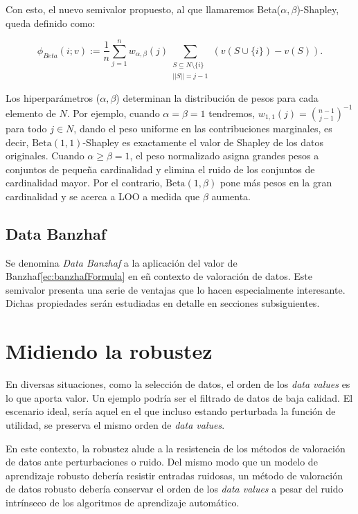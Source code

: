 Con esto, el nuevo semivalor propuesto, al que llamaremos
Beta($\alpha, \beta$)-Shapley, queda definido como:

\begin{equation*}
  \label{eq:betaShapley}
  \phi_{Beta}(i;v) := \frac{1}{n} \sum_{j=1}^{n} 
  w_{\alpha, \beta}(j) \sum_{\substack{S \subseteq N \setminus \{i\}
  \\ ||S||=j-1}}
  (v(S \cup \{i\})-v(S)).
\end{equation*}

Los hiperparámetros ($\alpha, \beta$) determinan la
distribución de pesos para cada elemento de $N$.
Por ejemplo, cuando $\alpha = \beta = 1$ tendremos,
$w_{1,1}(j) = \binom{n-1}{j-1}^{-1}$ para todo $j \in N$,
dando el peso uniforme en las contribuciones marginales,
es decir, $\text{Beta}(1,1)$-Shapley es exactamente
el valor de Shapley de los datos originales.
Cuando $\alpha \geq \beta = 1$, el peso normalizado asigna
grandes pesos a conjuntos de pequeña cardinalidad y elimina
el ruido de los conjuntos de cardinalidad mayor.
Por el contrario, $\text{Beta}(1,\beta)$ pone más pesos en
la gran cardinalidad y se acerca a LOO a medida que $\beta$
aumenta.

\subsection*{Data Banzhaf}
Se denomina \textit{Data Banzhaf} a la aplicación del valor de
Banzhaf\ref{ec:banzhafFormula} en eñ contexto de valoración
de datos. Este semivalor presenta una serie de ventajas
que lo hacen especialmente interesante. Dichas
propiedades serán estudiadas en detalle en secciones
subsiguientes.

\newpage
\section{Midiendo la robustez}

En diversas situaciones, como la selección de datos, el orden
de los \textit{data values} es lo que aporta valor\cite{betaShapley}.
Un ejemplo podría ser el filtrado de datos de baja calidad.
El escenario ideal, sería aquel en el que incluso
estando perturbada la función de utilidad, se preserva
el mismo orden de \textit{data values}.

En este contexto, la robustez alude a la resistencia
de los métodos de valoración de datos ante perturbaciones
o ruido. Del mismo modo que un modelo de aprendizaje robusto
debería resistir entradas ruidosas, un método de valoración de
datos robusto debería conservar el orden de los \textit{data values} a pesar
del ruido intrínseco de los algoritmos
de aprendizaje automático.

